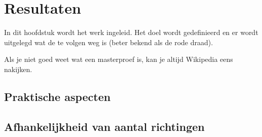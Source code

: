 \chapter{Resultaten}
\label{hoofdstuk:resultaten}
In dit hoofdstuk wordt het werk ingeleid. Het doel wordt gedefinieerd en er
wordt uitgelegd wat de te volgen weg is (beter bekend als de rode draad).

Als je niet goed weet wat een masterproef is, kan je altijd
Wikipedia eens nakijken.


\newcommand{\rendercaption}[1] {
  \caption[Rendertijd #1 in functie van K]{Rendertijd #1 in functie van K - \small Deze tabel toont statistieken over de rendertijd voor #1 voor verschillende waarden van K. Voor elke waarde van K is het algoritme zeven keer uitgevoerd. De \textit{Min} kolom staat voor de minimale rendertijd, de \textit{Max} kolom voor de maximale rendertijd en de \textit{Med} kolom voor de mediaan van de zeven tijd. De (min, max, med) rendertijd is procentueel uitgedrukt ten opzichte van de (min, max, med) rendertijd van de $\symKd$ boom. }}


\newcommand{\rendertable}[3] {
  \begin{table}
    \centering
    \csvreader[rendertimeTableStyle]{#1}{}%
    {\K & \renderMinKdFeet & \renderMedKdFeet & \renderMaxKdFeet & \renderMinKdSponza & \renderMedKdSponza & \renderMaxKdSponza & \renderMinKdConference & \renderMedKdConference & \renderMaxKdConference}%
    \rendercaption{#2}
    \label{#3}
    \end{table}
}

\section{Praktische aspecten}
\section{Afhankelijkheid van aantal richtingen}


